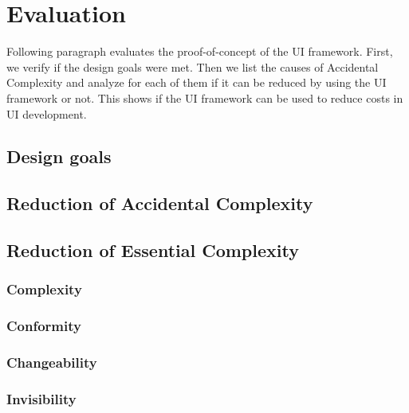 \section{Evaluation}\label{evaluation}

Following paragraph evaluates the proof-of-concept of the UI framework. First, we verify if the design goals were met. Then we list the causes of Accidental Complexity and analyze for each of them if it can be reduced by using the UI framework or not.
This shows if the UI framework can be used to reduce costs in UI development.

\subsection{Design goals}\label{designgoals}

\subsection{Reduction of Accidental Complexity}\label{accidentalcomplexity}
\subsection{Reduction of Essential Complexity}\label{essentialcomplexity}
\subsubsection{Complexity}\label{complexity}
\subsubsection{Conformity}\label{conformity}
\subsubsection{Changeability}\label{changeability}
\subsubsection{Invisibility}\label{invisibility}
